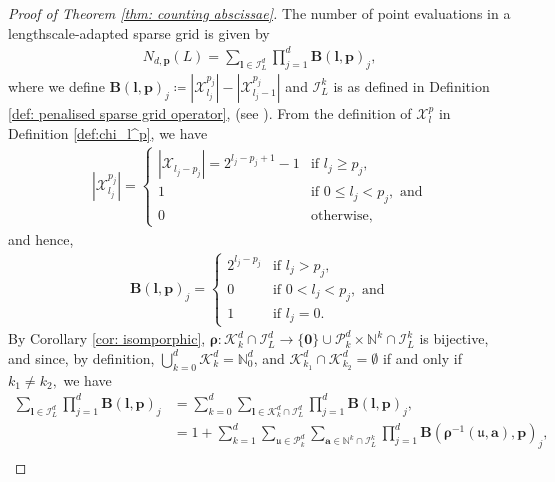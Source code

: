 \documentclass[pdflatex,sn-mathphys-num]{sn-jnl}%
\theoremstyle{thmstyleone}%
\theoremstyle{thmstyletwo}%
\theoremstyle{thmstylethree}%
\begin{document}
\begin{proof}[Proof of Theorem \ref{thm: counting abscissae}]
    The number of point evaluations in a lengthscale-adapted sparse grid is given by
    \begin{align}
        N_{d,\mathbf{p}}(L) =\sum_{\boldsymbol{l}\in\mathcal{I}^d_{L}}\prod_{j=1}^d\mathbf{B}(\boldsymbol{l},\mathbf{p})_j,\nonumber
    \end{align}
    where we define \(\mathbf{B}(\boldsymbol{l},\mathbf{p})_j\coloneqq|\mathcal{X}_{l_j}^{p_j}|-|\mathcal{X}_{l_j-1}^{p_j}|\) and \(\mathcal{I}_L^k\) is as defined in Definition \ref{def: penalised sparse grid operator}, (see \cite{Plumlee2014}). From the definition of \(\mathcal{X}_l^p\) in Definition \ref{def:chi_l^p}, we have
    \begin{align}
        |\mathcal{X}_{l_j}^{p_j}|=\begin{cases}
            |\mathcal{X}_{l_j-p_j}|=2^{l_j-p_j+1}-1&\textrm{if }l_j\geq p_j,\\
            1&\textrm{if }0\leq l_j< p_j, \textrm{ and}\\
            0&\textrm{otherwise},
        \end{cases}\nonumber
    \end{align}
    and hence,
    \begin{align}
        \mathbf{B}(\boldsymbol{l},\mathbf{p})_j=\begin{cases}
            2^{l_j-p_j}&\textrm{if }l_j> p_j,\\
            0&\textrm{if }0<l_j< p_j, \textrm{ and}\\
            1&\textrm{if }l_j=0.
        \end{cases}\nonumber
    \end{align}
    By Corollary \ref{cor: isomporphic}, \(\boldsymbol{\rho}:\mathcal{K}_k^d\cap\mathcal{I}_L^d\rightarrow\{\mathbf{0}\}\cup\mathcal{P}^d_k\times\mathbb{N}^k\cap\mathcal{I}^k_{L}\) is bijective, and since, by definition, \(\bigcup_{k=0}^d\mathcal{K}_k^d =\mathbb{N}_0^d\), and \(\mathcal{K}_{k_1}^d\cap\mathcal{K}_{k_2}^d=\emptyset\) if and only if \(k_1\neq k_2,\)
    we have
    \begin{align}
        \sum_{\boldsymbol{l}\in\mathcal{I}^d_{L}}\prod_{j=1}^d\mathbf{B}(\boldsymbol{l},\mathbf{p})_j &= \sum_{k=0}^d\sum_{\boldsymbol{l}\in\mathcal{K}_k^d\cap\mathcal{I}^d_{L}}\prod_{j=1}^d\mathbf{B}(\boldsymbol{l},\mathbf{p})_j,\nonumber\\
        &= 1+ \sum_{k=1}^d\sum_{\mathfrak{u}\in\mathcal{P}^d_k}\sum_{\mathbf{a}\in\mathbb{N}^k\cap\mathcal{I}^k_L}\prod_{j=1}^d\mathbf{B}(\boldsymbol{\rho}^{-1}(\mathfrak{u},\mathbf{a}),\mathbf{p})_j,\nonumber\\

\end{align}
\end{proof}
\end{document}
